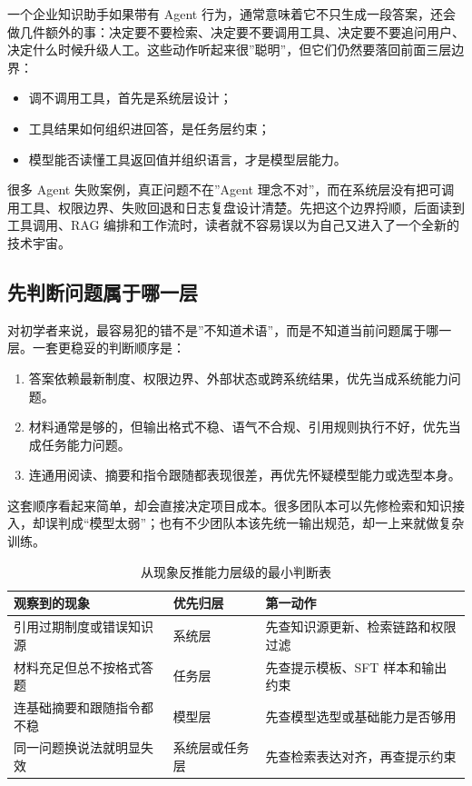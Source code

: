 一个企业知识助手如果带有 Agent 行为，通常意味着它不只生成一段答案，还会做几件额外的事：决定要不要检索、决定要不要调用工具、决定要不要追问用户、决定什么时候升级人工。这些动作听起来很”聪明”，但它们仍然要落回前面三层边界：
\begin{itemize}
  \item 调不调用工具，首先是系统层设计；
  \item 工具结果如何组织进回答，是任务层约束；
  \item 模型能否读懂工具返回值并组织语言，才是模型层能力。
\end{itemize}

很多 Agent 失败案例，真正问题不在”Agent 理念不对”，而在系统层没有把可调用工具、权限边界、失败回退和日志复盘设计清楚。先把这个边界捋顺，后面读到工具调用、RAG 编排和工作流时，读者就不容易误以为自己又进入了一个全新的技术宇宙。

\subsection{先判断问题属于哪一层}
对初学者来说，最容易犯的错不是”不知道术语”，而是不知道当前问题属于哪一层。一套更稳妥的判断顺序是：
\begin{enumerate}
  \item 答案依赖最新制度、权限边界、外部状态或跨系统结果，优先当成系统能力问题。
  \item 材料通常是够的，但输出格式不稳、语气不合规、引用规则执行不好，优先当成任务能力问题。
  \item 连通用阅读、摘要和指令跟随都表现很差，再优先怀疑模型能力或选型本身。
\end{enumerate}

这套顺序看起来简单，却会直接决定项目成本。很多团队本可以先修检索和知识接入，却误判成“模型太弱”；也有不少团队本该先统一输出规范，却一上来就做复杂训练。

\begin{table}[H]
\centering
\small
\begin{tabularx}{\textwidth}{>{\raggedright\arraybackslash}p{3.2cm}>{\raggedright\arraybackslash}p{2.8cm}>{\raggedright\arraybackslash}X}
\toprule
\textbf{观察到的现象} & \textbf{优先归层} & \textbf{第一动作} \\
\midrule
引用过期制度或错误知识源 & 系统层 & 先查知识源更新、检索链路和权限过滤 \\
材料充足但总不按格式答题 & 任务层 & 先查提示模板、SFT 样本和输出约束 \\
连基础摘要和跟随指令都不稳 & 模型层 & 先查模型选型或基础能力是否够用 \\
同一问题换说法就明显失效 & 系统层或任务层 & 先查检索表达对齐，再查提示约束 \\
\bottomrule
\end{tabularx}
\caption{从现象反推能力层级的最小判断表}
\label{tab:llm-routing}
\end{table}

